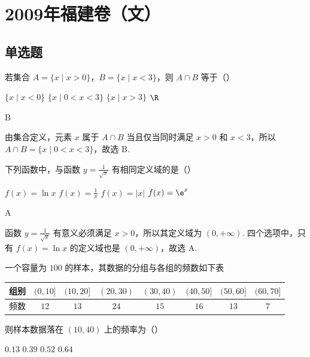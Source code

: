 \chapter{2009年福建卷（文）}

\section{单选题}

\begin{problem}
若集合 \(A = \{x \mid x > 0\}\)，\(B = \{x \mid x < 3\}\)，则 \(A \cap B\) 等于（\quad）

\choices
    {\(\{x\mid x < 0\}\)}
    {\(\{x\mid 0 < x < 3\}\)}
    {\(\{x\mid x > 3\}\)}
    {\(\R\)}
\end{problem}

\begin{answer}
B
\end{answer}

\begin{solution}
由集合定义，元素 \(x\) 属于 \(A\cap B\) 当且仅当同时满足 \(x>0\) 和 \(x<3\)，所以 \(A\cap B=\{x\mid 0<x<3\}\)，故选 B.
\end{solution}

\begin{problem}
下列函数中，与函数 \( y = \frac{1}{\sqrt{x}} \) 有相同定义域的是（\quad）

\choices
    {\(f(x) = \ln x\)}
    {\(f(x) = \frac{1}{x}\)}
    {\(f(x) = |x|\)}
    {\(f(x) = \e^{x}\)}
\end{problem}

\begin{answer}
A
\end{answer}

\begin{solution}
函数 \(y=\frac{1}{\sqrt{x}}\) 有意义必须满足 \(x>0\)，所以其定义域为 \((0,+\infty)\). 四个选项中，只有 \(f(x)=\ln x\) 的定义域也是 \((0,+\infty)\)，故选 A.
\end{solution}

\begin{problem}
一个容量为 \(100\) 的样本，其数据的分组与各组的频数如下表

\begin{center}
\begin{tabular}{|c|c|c|c|c|c|c|c|}
\hline
组别 & \((0,10]\) & \((10,20]\) & \((20,30)\) & \((30,40)\) & \((40,50]\) & \((50,60]\) & \((60,70]\) \\
\hline
频数 & \(12\) & \(13\) & \(24\) & \(15\) & \(16\) & \(13\) & \(7\) \\
\hline
\end{tabular}
\end{center}

则样本数据落在 \( (10,40) \) 上的频率为（\quad）

\choices
    {\(0.13\)}
    {\(0.39\)}
    {\(0.52\)}
    {\(0.64\)}
\end{problem}


